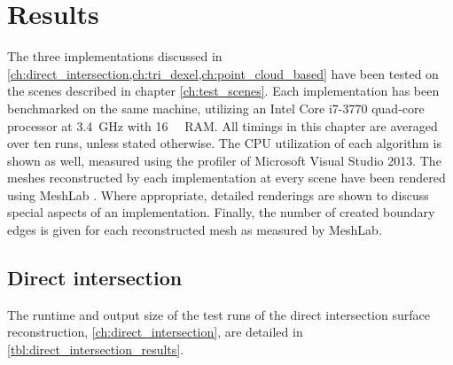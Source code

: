 
\begingroup
\renewcommand{\textfraction}{1.0}
\renewcommand{\floatpagefraction}{0.9}

\chapter{Results}
\label{ch:results}

The three implementations discussed in \cref{ch:direct_intersection,ch:tri_dexel,ch:point_cloud_based} have been tested on the scenes described in chapter \cref{ch:test_scenes}.
Each implementation has been benchmarked on the same machine, utilizing an Intel Core i7-3770 quad-core processor at \SI{3.4}{\giga\hertz} with \SI{16}{\gibi\byte} RAM.
All timings in this chapter are averaged over ten runs, unless stated otherwise.
The CPU utilization of each algorithm is shown as well, measured using the profiler of Microsoft Visual Studio 2013.
The meshes reconstructed by each implementation at every scene have been rendered using MeshLab \cite{meshlab}.
Where appropriate, detailed renderings are shown to discuss special aspects of an implementation.
Finally, the number of created boundary edges is given for each reconstructed mesh as measured by MeshLab.


\section{Direct intersection}
\label{sec:direct_intersection_results}

The runtime and output size of the test runs of the direct intersection surface reconstruction, \cf \cref{ch:direct_intersection}, are detailed in \cref{tbl:direct_intersection_results}.

